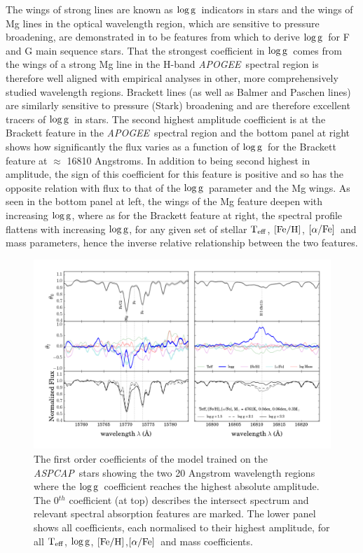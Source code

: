 \documentclass[12pt, preprint]{aastex}
\newcommand{\project}[1]{\textsl{#1}}
\newcommand{\apogee}{\project{APOGEE}}
\newcommand{\aspcap}{\project{ASPCAP}}
\newcommand{\teff}{\mbox{$\rm T_{eff}$}}
\newcommand{\feh}{\mbox{$\rm [Fe/H]$}}
\newcommand{\alphafe}{\mbox{$\rm [\alpha/Fe]$}}
\newcommand{\logg}{\mbox{$\rm \log g$}}
\begin{document}
The wings of strong lines are known as \logg\ indicators in stars \citep{Gray2008} and the wings of Mg lines in the optical wavelength region, which are sensitive to pressure broadening, are demonstrated in \citet{F1997} to be features from which to derive \logg\ for F and G main sequence stars. That the strongest coefficient in \logg\ comes from the wings of a strong Mg line in the H-band \apogee\ spectral region is therefore well aligned with empirical analyses in other, more comprehensively studied wavelength regions. Brackett lines (as well as Balmer and Paschen lines)  are similarly sensitive to pressure (Stark) broadening and are therefore excellent tracers of \logg\ in stars. The second highest amplitude coefficient is at the Brackett feature in the \apogee\ spectral region and the bottom panel at right shows how significantly the flux varies as a function of \logg\ for the Brackett feature at $\approx$ 16810 Angstroms. In addition to being second highest in amplitude, the sign of this coefficient for this feature is positive and so has the opposite relation with flux to that of the \logg\ parameter and the Mg wings. As seen in the bottom panel at left, the wings of the Mg feature deepen with increasing \logg, where as for the Brackett feature at right, the spectral profile flattens with increasing \logg, for any given set of stellar \teff, \feh, \alphafe\ and mass parameters, hence the inverse relative relationship between the two features. 


\begin{figure}[p!]
\centering
    \includegraphics[scale=0.51]{./plots/coeffs_g_3.png}
  \caption{The first order coefficients of the model trained on the \aspcap\ stars showing the two 20 Angstrom wavelength regions where the \logg\ coefficient reaches the highest absolute amplitude. The 0$^{th}$ coefficient (at top) describes the intersect spectrum and relevant spectral absorption features are marked. The lower panel shows all coefficients, each normalised to their highest amplitude, for all \teff, \logg, \feh,\alphafe\ and mass coefficients.}
\label{fig:logg}
\end{figure}
\end{document}
